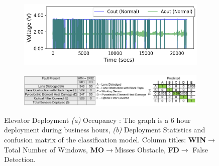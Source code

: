 \documentclass[manuscript,screen,review]{acmart} %
\newcommand{\ca}{{\it (a) }}
\newcommand{\cb}{{\it (b) }}
\providecommand{\DIFaddbeginFL}{} %
\providecommand{\DIFaddendFL}{} %
\providecommand{\DIFdelbeginFL}{} %
\providecommand{\DIFdelendFL}{} %
\newcommand{\DIFscaledelfig}{0.5}
\newlength{\DIFdelgraphicswidth} %
\newlength{\DIFdelgraphicsheight} %
\newcommand{\DIFaddincludegraphics}[2][]{{\color{blue}\fbox{\DIFOincludegraphics[#1]{#2}}}} %
\newcommand{\DIFdelincludegraphics}[2][]{%
\sbox{\DIFdelgraphicsbox}{\DIFOincludegraphics[#1]{#2}}%
\settoboxwidth{\DIFdelgraphicswidth}{\DIFdelgraphicsbox} %
\settoboxtotalheight{\DIFdelgraphicsheight}{\DIFdelgraphicsbox} %
\scalebox{\DIFscaledelfig}{%
\parbox[b]{\DIFdelgraphicswidth}{\usebox{\DIFdelgraphicsbox}\\[-\baselineskip] \rule{\DIFdelgraphicswidth}{0em}}\llap{\resizebox{\DIFdelgraphicswidth}{\DIFdelgraphicsheight}{%
\setlength{\unitlength}{\DIFdelgraphicswidth}%
\begin{picture}(1,1)%
\thicklines\linethickness{2pt} %
{\color[rgb]{1,0,0}\put(0,0){\framebox(1,1){}}}%
{\color[rgb]{1,0,0}\put(0,0){\line( 1,1){1}}}%
{\color[rgb]{1,0,0}\put(0,1){\line(1,-1){1}}}%
\end{picture}%
}\hspace*{3pt}}} %
} %
\DeclareRobustCommand{\DIFaddbeginFL}{\DIFOaddbeginFL \let\includegraphics\DIFaddincludegraphics} %
\DeclareRobustCommand{\DIFaddendFL}{\DIFOaddendFL \let\includegraphics\DIFOincludegraphics} %
\DeclareRobustCommand{\DIFdelbeginFL}{\DIFOdelbeginFL \let\includegraphics\DIFdelincludegraphics} %
\DeclareRobustCommand{\DIFdelendFL}{\DIFOaddendFL \let\includegraphics\DIFOincludegraphics} %
\begin{document}
\begin{figure}
    \DIFdelbeginFL %
\DIFdelendFL \DIFaddbeginFL \begin{subfigure}[t]{0.4\textwidth}
\DIFaddendFL \includegraphics[width=\textwidth]{figures/deployment/elevator/afternoon-6hr.png}
\DIFdelbeginFL %
\DIFdelendFL \caption{}
    	\label{fig:deployment_csl_elevator}\end{subfigure}\hfill \begin{subfigure}[b]{0.59\textwidth}
	    \DIFdelbeginFL %
\DIFdelendFL \DIFaddbeginFL \includegraphics[width=\textwidth, height=0.65in]{figures/deployment/elevator/confusion-matrix-elevator-camera-ready.png}
		\DIFaddendFL \caption{}
		\label{fig:elevator_classification_results}
	\end{subfigure}\DIFdelbeginFL %
\DIFdelendFL \caption{\footnotesize Elevator Deployment \ca Occupancy : The graph is a 6 hour deployment during business hours, \cb Deployment Statistics and confusion matrix of the classification model. Column titles: \textbf{WIN}$\rightarrow$Total Number of Windows, \textbf{MO}$\rightarrow$Misses Obstacle, \textbf{FD}$\rightarrow$ False Detection.}
\DIFdelbeginFL %
\DIFdelendFL \end{figure}
\end{document}
